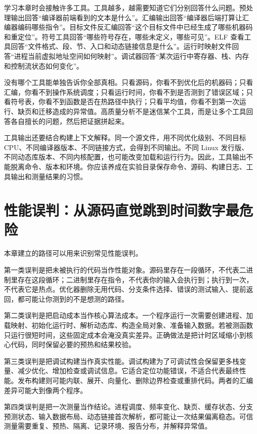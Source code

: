 学习本章时会接触许多工具。工具越多，越需要知道它们分别回答什么问题。预处理输出回答“编译器前端看到的文本是什么”。汇编输出回答“编译器后端打算让汇编器编码哪些指令”。目标文件反汇编回答“这个目标文件中已经生成了哪些机器码和重定位”。符号工具回答“哪些符号存在，哪些未定义，哪些可见”。ELF 查看工具回答“文件格式、段、节、入口和动态链接信息是什么”。运行时映射文件回答“进程当前虚拟地址空间如何映射”。调试器回答“某次运行中寄存器、栈、内存和控制流状态如何变化”。

没有哪个工具能单独告诉你全部真相。只看源码，你看不到优化后的机器码；只看汇编，你看不到操作系统调度；只看运行时间，你看不到是否测到了错误区域；只看符号表，你看不到函数是否在热路径中执行；只看平均值，你看不到第一次运行、缺页和迁移造成的异常值。高质量分析不是迷信某个工具，而是让多个工具回答各自擅长的问题，然后把证据拼起来。

工具输出还要结合构建上下文解释。同一个源文件，用不同优化级别、不同目标 CPU、不同编译器版本、不同链接方式，会得到不同输出。不同 Linux 发行版、不同动态库版本、不同内核配置，也可能改变加载和运行行为。因此，工具输出不能脱离命令、版本和环境。你应该养成在实验目录保存命令、源码、构建日志、工具输出和测量结果的习惯。

\section{性能误判：从源码直觉跳到时间数字最危险}

本章建立的路径可以用来识别常见性能误判。

第一类误判是把未被执行的代码当作性能对象。源码里存在一段循环，不代表二进制里存在这段循环；二进制里存在指令，不代表你的输入会执行到；执行到一次，不代表它是热点。优化器删除无用代码、分支条件选择、错误的测试输入、提前返回，都可能让你测到的不是想测的路径。

第二类误判是把启动成本当作核心算法成本。一个程序运行一次需要创建进程、加载映射、初始化运行时、解析动态库、构造全局对象、准备输入数据。若被测函数只运行很短时间，这些固定成本会淹没真实差异。正确做法是把计时区域缩小到核心代码，同时保留必要的预热和结果校验。

第三类误判是把调试构建当作真实性能。调试构建为了可调试性会保留更多栈变量、减少优化、增加检查或调试信息。它适合定位功能错误，不适合代表最终性能。发布构建则可能内联、展开、向量化、删除边界检查或重排代码。两者的汇编差异可能大到像两个程序。

第四类误判是把一次测量当作结论。进程调度、频率变化、缺页、缓存状态、分支预测状态、输入数据布局、动态链接首次解析，都可能让一次结果偏离稳态。可信测量需要重复、预热、隔离、记录环境、报告分布，并解释异常值。

